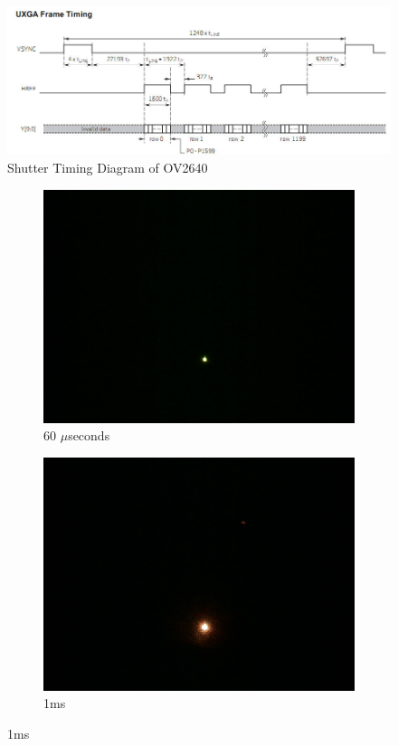 \begin{figure}[ht]
\includegraphics[width=\textwidth]{pics/OV2640timing}
\caption{Shutter Timing Diagram of OV2640\cite{RollingShutterOV2640}}
\label{fig:ShutterTimingOV2640}
\end{figure}

    \begin{figure}[ht]
    \centering
    \begin{subfigure}{0.5\textwidth}
    \centering
        \includegraphics[width=0.5\linewidth]{pics/exposure/60us}
        \caption{60 $\mu$seconds}
        \label{fig:exp60us}
    \end{subfigure}%
    \begin{subfigure}{0.5\textwidth}
    \centering
        \includegraphics[width=0.5\linewidth]{pics/exposure/1ms}
        \caption{1ms}
        \label{fig:exp1ms}
    \end{subfigure}
    

\end{figure}
